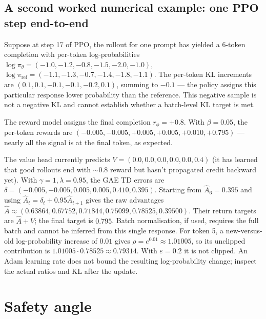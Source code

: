 \documentclass[11pt,oneside]{scrbook}
\begin{document}
\section{A second worked numerical example: one PPO step end-to-end}

Suppose at step 17 of PPO, the rollout for one prompt has yielded a
6-token completion with per-token log-probabilities
$\log\pi_\theta = (-1.0, -1.2, -0.8, -1.5, -2.0, -1.0)$,
$\log\pi_{\text{ref}} = (-1.1, -1.3, -0.7, -1.4, -1.8, -1.1)$.
The per-token KL increments are
$(0.1, 0.1, -0.1, -0.1, -0.2, 0.1)$, summing to $-0.1$ --- the policy
assigns this particular response lower probability than the reference.
This negative sample is not a negative KL and cannot establish whether a
batch-level KL target is met.

The reward model assigns the final completion $r_\phi = +0.8$. With
$\beta = 0.05$, the per-token rewards are
$(-0.005, -0.005, +0.005, +0.005, +0.010, +0.795)$ --- nearly all the
signal is at the final token, as expected.

The value head currently predicts $V = (0.0, 0.0, 0.0, 0.0, 0.0, 0.4)$
(it has learned that good rollouts end with $\sim\!0.8$ reward but
hasn't propagated credit backward yet). With $\gamma = 1, \lambda = 0.95$,
the GAE TD errors are
$\delta=(-0.005,-0.005,0.005,0.005,0.410,0.395)$.
Starting from $\hat A_6=0.395$ and using
$\hat A_t=\delta_t+0.95\hat A_{t+1}$ gives the raw advantages
$\hat A\approx(0.63864,0.67752,0.71844,0.75099,0.78525,0.39500)$.
Their return targets are $\hat A+V$; the final target is $0.795$.
Batch normalisation, if used, requires the full batch and cannot be inferred
from this single response.
For token 5, a new-versus-old log-probability increase of $0.01$ gives
$\rho=e^{0.01}\approx1.01005$, so its unclipped contribution is
$1.01005\cdot0.78525\approx0.79314$. With $\varepsilon=0.2$ it is not clipped.
An Adam learning rate does not bound the resulting log-probability change;
inspect the actual ratios and KL after the update.

\chapter{Safety angle}
\end{document}
